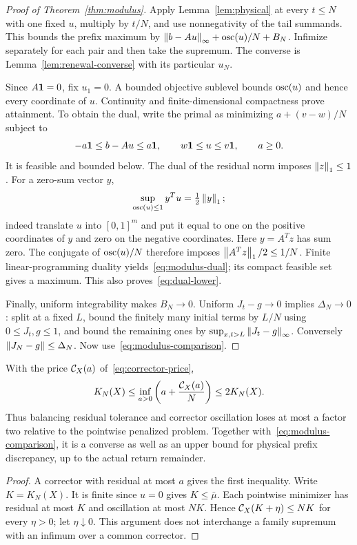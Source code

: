 \begin{proof}[Proof of Theorem~\ref{thm:modulus}]
Apply Lemma~\ref{lem:physical} at every $t\le N$ with one fixed $u$, multiply by $t/N$, and use nonnegativity of the tail summands. This bounds the prefix maximum by
$\left\lVert b-Au\right\rVert_\infty+\operatorname{osc}(u)/N+B_N$.
Infimize separately for each pair and then take the supremum. The converse is Lemma~\ref{lem:renewal-converse} with its particular $u_N$.

Since $A\mathbf 1=0$, fix $u_1=0$. A bounded objective sublevel bounds $\operatorname{osc}(u)$ and hence every coordinate of $u$. Continuity and finite-dimensional compactness prove attainment. To obtain the dual, write the primal as minimizing $a+(v-w)/N$ subject to
\[
 -a\mathbf 1\le b-Au\le a\mathbf 1,\qquad
 w\mathbf 1\le u\le v\mathbf 1,\qquad a\ge0.
\]
It is feasible and bounded below. The dual of the residual norm imposes $\left\lVert z\right\rVert_1\le1$. For a zero-sum vector $y$,
\[
 \sup_{\operatorname{osc}(u)\le1}y^Tu=\tfrac12\left\lVert y\right\rVert_1;
\]
indeed translate $u$ into $[0,1]^m$ and put it equal to one on the positive coordinates of $y$ and zero on the negative coordinates. Here $y=A^Tz$ has sum zero. The conjugate of $\operatorname{osc}(u)/N$ therefore imposes $\left\lVert A^Tz\right\rVert_1/2\le1/N$. Finite linear-programming duality yields~\eqref{eq:modulus-dual}; its compact feasible set gives a maximum. This also proves~\eqref{eq:dual-lower}.

Finally, uniform integrability makes $B_N\to0$. Uniform $J_t-g\to0$ implies $\Delta_N\to0$: split at a fixed $L$, bound the finitely many initial terms by $L/N$ using $0\le J_t,g\le1$, and bound the remaining ones by $\sup_{x,t>L}\left\lVert J_t-g\right\rVert_\infty$. Conversely $\left\lVert J_N-g\right\rVert\le\Delta_N$. Now use~\eqref{eq:modulus-comparison}.
\end{proof}

\begin{corollary}\label{cor:balanced-price}
With the price $\mathcal C_X(a)$ of~\eqref{eq:corrector-price},
\begin{equation}\label{eq:balanced-price}
 K_N(X)\le\inf_{a>0}\left(a+\frac{\mathcal C_X(a)}N\right)\le2K_N(X).
\end{equation}
Thus balancing residual tolerance and corrector oscillation loses at most a factor two relative to the pointwise penalized problem. Together with~\eqref{eq:modulus-comparison}, it is a converse as well as an upper bound for physical prefix discrepancy, up to the actual return remainder.
\end{corollary}
\begin{proof}
A corrector with residual at most $a$ gives the first inequality. Write $K=K_N(X)$. It is finite since $u=0$ gives $K\le\bar\mu$. Each pointwise minimizer has residual at most $K$ and oscillation at most $NK$. Hence $\mathcal C_X(K+\eta)\le NK$ for every $\eta>0$; let $\eta\downarrow0$. This argument does not interchange a family supremum with an infimum over a common corrector.
\end{proof}

